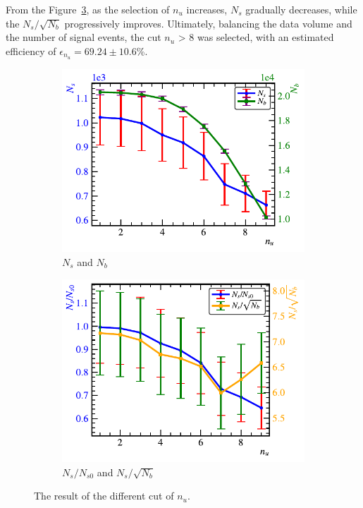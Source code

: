From the Figure~\ref{fast:nusummary}, as the selection of $n_u$ increases, $N_s$ gradually decreases, while the $N_s/\sqrt{N_b}$ progressively improves. Ultimately, balancing the data volume and the number of signal events, the cut $n_u$ > 8 was selected, with an estimated efficiency of  $\epsilon_{n_u}=69.24\pm10.6$\si{\percent}.

\begin{figure}[!htbp]
	\centering
	\begin{subfigure}[b]{0.4\textwidth}
		\includegraphics[width=\textwidth]{neutrontag/fastrecon/npmtNsNb.pdf}
		\caption{$N_s$ and $N_b$}
		\label{fast:nuNsNb}
	\end{subfigure}

	\begin{subfigure}[b]{0.4\textwidth}
		\includegraphics[width=\textwidth]{neutrontag/fastrecon/npmtNssn.pdf}
		\caption{$N_s/N_{s0}$ and $N_s/\sqrt{N_b}$}
		\label{fast:nuSN}
	\end{subfigure}
	\caption{The result of the different cut of $n_u$.}
	\label{fast:nusummary}
\end{figure}

